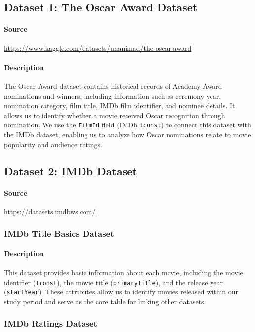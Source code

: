 \documentclass[12pt]{article}
\begin{document}
\subsection{Dataset 1: The Oscar Award Dataset}

\paragraph{Source}
\url{https://www.kaggle.com/datasets/unanimad/the-oscar-award}

\paragraph{Description}
 The Oscar Award dataset contains historical records of Academy Award nominations and winners, including information such as ceremony year, nomination category, film title, IMDb film identifier, and nominee details. It allows us to identify whether a movie received Oscar recognition through nomination. We use the \texttt{FilmId} field (IMDb \texttt{tconst}) to connect this dataset with the IMDb dataset, enabling us to analyze how Oscar nominations relate to movie popularity and audience ratings.


\subsection{Dataset 2: IMDb Dataset}

\paragraph{Source}
\url{https://datasets.imdbws.com/}

\subsubsection{IMDb Title Basics Dataset}

\paragraph{Description}
This dataset provides basic information about each movie, including the movie identifier (\texttt{tconst}), the movie title (\texttt{primaryTitle}), and the release year (\texttt{startYear}). These attributes allow us to identify movies released within our study period and serve as the core table for linking other datasets.

\subsubsection{IMDb Ratings Dataset}
\end{document}
